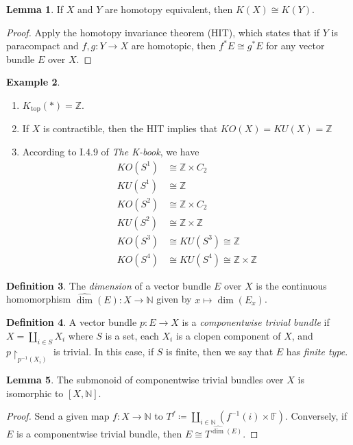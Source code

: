 \documentclass[10pt,letterpaper,cm]{nupset}
\theoremstyle{definition}
\newtheorem{definition}{Definition}[section]
\newtheorem{exmp}[definition]{Example}
\theoremstyle{theorem}
\newtheorem{lemma}[definition]{Lemma}
\theoremstyle{remark}
\newcommand{\F}{\mathbb F}
\newcommand{\N}{\mathbb N}
\newcommand{\Z}{\mathbb Z}
\newcommand{\1}{\mathbf{1}}
\newcommand{\0}{\vec 0}
\DeclareMathOperator{\topp}{\mathrm{top}}
\begin{document}
\begin{lemma}
If $X$ and $Y$ are homotopy equivalent, then $K(X) \cong K(Y)$.
\end{lemma}
\begin{proof}
Apply the homotopy invariance theorem (HIT), which states that if $Y$ is paracompact and $f, g: Y \to X$ are homotopic, then $f^{\ast}E \cong g^{\ast}E$ for any vector bundle $E$ over $X$.
\end{proof}

\begin{exmp} $ $
\begin{enumerate}
\item $K_{\topp}(\ast) = \Z$.
\item If $X$ is contractible, then the HIT implies that $KO(X) = KU(X) = \Z$
\item According to I.4.9 of \textit{The K-book}, we have
\begin{align*}
KO(S^1) & \cong \Z \times C_2 
\\ KU(S^1) &  \cong \Z \\
KO(S^2) & \cong \Z \times C_2  
\\  KU(S^2) & \cong \Z \times \Z
\\ KO(S^3) & \cong KU(S^3) \cong \Z 
\\ KO(S^4) & \cong KU(S^4) \cong \Z \times \Z
\end{align*}
\end{enumerate}
\end{exmp}


\begin{definition}
The \textit{dimension} of a vector bundle $E$ over $X$ is the continuous homomorphism $\widehat{\dim}(E) : X \to \N$ given by $x \mapsto \dim(E_x)$.
\end{definition}

\begin{definition}
A vector bundle $p: E \to X$ is a \textit{componentwise trivial bundle} if  $X =\coprod_{i\in S} X_i$ where $S$ is a set, each $X_i$ is a clopen component of $X$, and $p\restriction_{p^{{-1}}(X_i)}$ is trivial.
In this case, if $S$ is finite, then we say that $E$ has \textit{finite type}.
\end{definition}

\begin{lemma}
The submonoid of componentwise trivial bundles over $X$ is isomorphic to $\left[X, \N\right]$.
\end{lemma}
\begin{proof}
Send a given map $f: X \to \N$ to $T^f \coloneqq \coprod_{i \in \N}\left(f^{{-1}}(i) \times \F\right)$. Conversely, if $E$ is a componentwise trivial bundle, then $E \cong T^{\widehat{\dim}(E)}$.
\end{proof}
\end{document}
